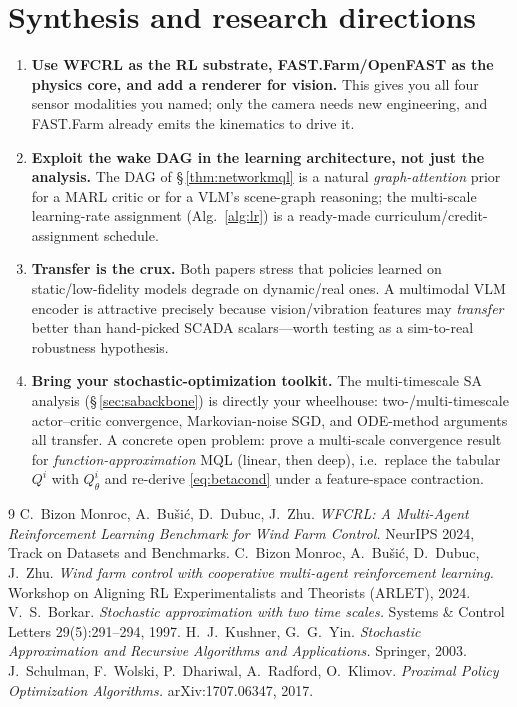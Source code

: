 \documentclass[11pt]{article}
\theoremstyle{plain}
\theoremstyle{definition}
\begin{document}
\section{Synthesis and research directions}

\begin{enumerate}[leftmargin=1.5em,itemsep=3pt]
  \item \textbf{Use WFCRL as the RL substrate, FAST.Farm/OpenFAST as the
  physics core, and add a renderer for vision.} This gives you all four sensor
  modalities you named; only the camera needs new engineering, and FAST.Farm
  already emits the kinematics to drive it.

  \item \textbf{Exploit the wake DAG in the learning architecture, not just the
  analysis.} The DAG of \S\,\ref{thm:networkmql} is a natural
  \emph{graph-attention} prior for a MARL critic or for a VLM's scene-graph
  reasoning; the multi-scale learning-rate assignment (Alg.~\ref{alg:lr}) is a
  ready-made curriculum/credit-assignment schedule.

  \item \textbf{Transfer is the crux.} Both papers stress that policies learned
  on static/low-fidelity models degrade on dynamic/real ones. A multimodal VLM
  encoder is attractive precisely because vision/vibration features may
  \emph{transfer} better than hand-picked SCADA scalars---worth testing as a
  sim-to-real robustness hypothesis.

  \item \textbf{Bring your stochastic-optimization toolkit.} The multi-timescale
  SA analysis (\S\,\ref{sec:sabackbone}) is directly your wheelhouse:
  two-/multi-timescale actor--critic convergence, Markovian-noise SGD, and
  ODE-method arguments all transfer. A concrete open problem: prove a
  multi-scale convergence result for \emph{function-approximation} MQL (linear,
  then deep), i.e.\ replace the tabular $Q^i$ with $Q^i_\theta$ and re-derive
  \eqref{eq:betacond} under a feature-space contraction.
\end{enumerate}

\begin{thebibliography}{9}
 C.~Bizon Monroc, A.~Bu\v{s}i\'c, D.~Dubuc, J.~Zhu.
  \emph{WFCRL: A Multi-Agent Reinforcement Learning Benchmark for Wind Farm
  Control.} NeurIPS 2024, Track on Datasets and Benchmarks.
 C.~Bizon Monroc, A.~Bu\v{s}i\'c, D.~Dubuc, J.~Zhu.
  \emph{Wind farm control with cooperative multi-agent reinforcement learning.}
  Workshop on Aligning RL Experimentalists and Theorists (ARLET), 2024.
 V.~S.~Borkar. \emph{Stochastic approximation with two time
  scales.} Systems \& Control Letters 29(5):291--294, 1997.
 H.~J.~Kushner, G.~G.~Yin. \emph{Stochastic Approximation
  and Recursive Algorithms and Applications.} Springer, 2003.
 J.~Schulman, F.~Wolski, P.~Dhariwal, A.~Radford, O.~Klimov.
  \emph{Proximal Policy Optimization Algorithms.} arXiv:1707.06347, 2017.
\end{thebibliography}
\end{document}
